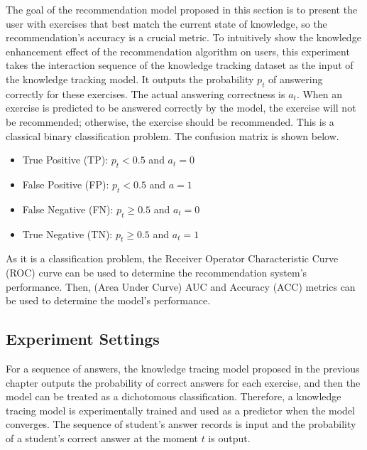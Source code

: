 
The goal of the recommendation model proposed in this section is to present the user with exercises that best match the current state of knowledge, so the recommendation's accuracy is a crucial metric. To intuitively show the knowledge enhancement effect of the recommendation algorithm on users, this experiment takes the interaction sequence of the knowledge tracking dataset as the input of the knowledge tracking model. It outputs the probability \(p_{t}\) of answering correctly for these exercises. The actual answering correctness is \(a_t\). When an exercise is predicted to be answered correctly by the model, the exercise will not be recommended; otherwise, the exercise should be recommended. This is a classical binary classification problem. The confusion matrix is shown below.

\begin{itemize}
    \item True Positive (TP): \(p_{t}<0.5\) and \(a_t=0\)
    \item False Positive (FP): \(p_{t} <0.5\) and \(a=1\)
    \item False Negative (FN): \(p_{t}\geq 0.5\) and \(a_t=0\)
    \item True Negative (TN): \(p_{t}\geq 0.5\) and \(a_t=1\)
\end{itemize}

As it is a classification problem, the Receiver Operator Characteristic Curve (ROC) curve can be used to determine the recommendation system's performance. Then, (Area Under Curve) AUC and Accuracy (ACC) metrics can be used to determine the model's performance.


\subsection{Experiment Settings}
For a sequence of answers, the knowledge tracing model proposed in the previous chapter outputs the probability of correct answers for each exercise, and then the model can be treated as a dichotomous classification. Therefore, a knowledge tracing model is experimentally trained and used as a predictor when the model converges. The sequence of student's answer records is input and the probability of a student's correct answer at the moment \(t\) is output.

